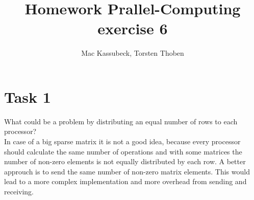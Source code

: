 \documentclass[10pt,a4paper,oneside]{article}
\author{Mac Kassubeck, Torsten Thoben}
\title{Homework Prallel-Computing exercise 6}
\begin{document}
\section{Task 1}
What could be a problem by distributing an equal number of rows to each processor? \\

In case of a big sparse matrix it is not a good idea, because every processor should calculate the same number of operations and with some matrices the number of non-zero elements is not equally distributed by each row. 
A better approuch is to send the same number of non-zero matrix elements. This would lead to a more complex implementation and more overhead from sending and receiving. 
\end{document}

